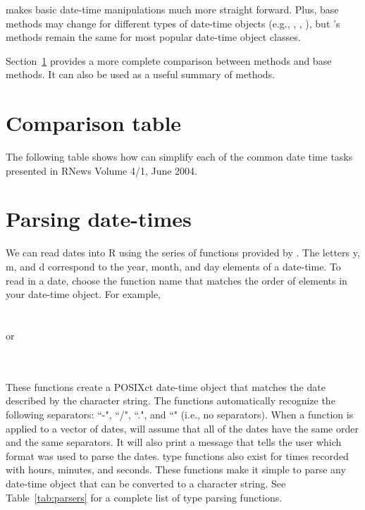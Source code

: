 \documentclass[article]{jss}
\begin{document}
 makes basic date-time manipulations much more straight forward. Plus, base  methods may change for different types of  date-time objects (e.g., , , ), but 's methods remain the same for most popular date-time object classes.

Section~\ref{sec:comparison} provides a more complete comparison between  methods and base  methods. It can also be used as a useful summary of  methods.

\section{Comparison table}
\label{sec:comparison}

The following table shows how  can simplify each of the common date time tasks presented in RNews Volume 4/1, June 2004.




\section{Parsing date-times}
\label{sec:parsing}

We can read dates into R using the  series of functions provided by . The letters y, m, and d correspond to the year, month, and day elements of a date-time. To read in a date, choose the function name that matches the order of elements in your date-time object. For example,\\

\\
\\

or

\\
\\


These functions create a POSIXct date-time object that matches the date described by the character string.  The functions automatically recognize the following separators: ``-", ``/", ``.", and ``" (i.e., no separators). When a  function is applied to a vector of dates,  will assume that all of the dates have the same order and the same separators. It will also print a message that tells the user which format was used to parse the dates.  type functions also exist for times recorded with hours, minutes, and seconds. These functions make it simple to parse any date-time object that can be converted to a character string. See Table~\ref{tab:parsers} for a complete list of  type parsing functions. 
\end{document}
